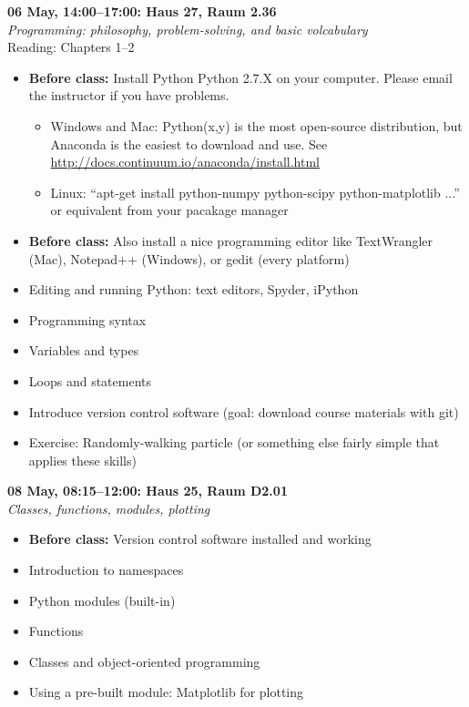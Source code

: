 \documentclass[10pt,a4paper]{amsart}
\begin{document}
\begin{minipage}{\linewidth} 
\noindent \textbf{06 May, 14:00--17:00: Haus 27, Raum 2.36}\\
\textit{Programming: philosophy, problem-solving, and basic volcabulary}\\
Reading: Chapters 1--2
\begin{itemize}
 \item \textbf{Before class:} Install Python Python 2.7.X on your computer. Please email the instructor if you have problems.
 \begin{itemize}
  \item Windows and Mac: Python(x,y) is the most open-source distribution, but Anaconda is the easiest to download and use. See \url{http://docs.continuum.io/anaconda/install.html}
  \item Linux: ``apt-get install python-numpy python-scipy python-matplotlib ...'' or equivalent from your pacakage manager
 \end{itemize}
 \item \textbf{Before class:} Also install a nice programming editor like TextWrangler (Mac), Notepad++ (Windows), or gedit (every platform)
 \item Editing and running Python: text editors, Spyder, iPython
 \item Programming syntax
 \item Variables and types
 \item Loops and statements
 \item Introduce version control software (goal: download course materials with git)
 \item Exercise: Randomly-walking particle (or something else fairly simple that applies these skills)
\end{itemize}
\vspace{12pt}
\end{minipage}

\begin{minipage}{\linewidth}
\noindent \textbf{08 May, 08:15--12:00: Haus 25, Raum D2.01}\\
\textit{Classes, functions, modules, plotting}
\begin{itemize}
 \item \textbf{Before class:} Version control software installed and working
 \item Introduction to namespaces
 \item Python modules (built-in)
 \item Functions
 \item Classes and object-oriented programming
 \item Using a pre-built module: Matplotlib for plotting
\end{itemize}
\vspace{12pt}
\end{minipage}
\end{document}
